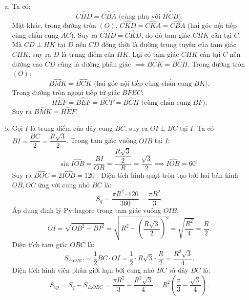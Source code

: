 \begin{bt}
{\begin{enumerate}[a)]
	Tứ giác $BFEC$ có hai đỉnh kề $F$ và $E$ cùng nhìn cạnh $BC$ dưới góc vuông, do đó tứ giác $BFEC$ nội tiếp đường tròn đường kính $BC$.
	Ta có $\widehat{ACT} = 90^\circ$ (góc nội tiếp chắn nửa đường tròn đường kính $AT$).
	Xét $\triangle ABD$ và $\triangle ATC$ có:
	\begin{itemize}
		\item $\widehat{ADB} = \widehat{ACT} = 90^\circ$;
		\item $\widehat{ABD} = \widehat{ATC}$ (hai góc nội tiếp cùng chắn cung $AC$).
	\end{itemize}
	Do đó $\triangle ABD \sim \triangle ATC$ (g-g).
	Suy ra $\dfrac{AB}{AT} = \dfrac{AD}{AC} \implies AB \cdot AC = AD \cdot AT$.
	\item Ta có:
	$$\widehat{CHD} = \widehat{CBA} \text{ (cùng phụ với } \widehat{HCB}\text{)}.$$
	Mặt khác, trong đường tròn $(O)$, $\widehat{CKD} = \widehat{CKA} = \widehat{CBA}$ (hai góc nội tiếp cùng chắn cung $AC$).
	Suy ra $\widehat{CHD} = \widehat{CKD}$, do đó tam giác $CHK$ cân tại $C$.
	Mà $CD \perp HK$ tại $D$ nên $CD$ đồng thời là đường trung tuyến của tam giác $CHK$, suy ra $D$ là trung điểm của $HK$.
	Lại có tam giác $CHK$ cân tại $C$ nên đường cao $CD$ cũng là đường phân giác $\implies \widehat{BCK} = \widehat{BCH}$.
	Trong đường tròn $(O)$:
	$$\widehat{BMK} = \widehat{BCK} \text{ (hai góc nội tiếp cùng chắn cung } BK\text{)}.$$
	Trong đường tròn ngoại tiếp tứ giác $BFEC$:
	$$\widehat{HEF} = \widehat{BEF} = \widehat{BCF} = \widehat{BCH} \text{ (cùng chắn cung } BF\text{)}.$$
	Suy ra $\widehat{BMK} = \widehat{HEF}$.
	\item Gọi $I$ là trung điểm của dây cung $BC$, suy ra $OI \perp BC$ tại $I$.
	Ta có $BI = \dfrac{BC}{2} = \dfrac{R\sqrt{3}}{2}$.
	Trong tam giác vuông $OIB$ tại $I$:
	$$\sin \widehat{IOB} = \dfrac{BI}{OB} = \dfrac{\dfrac{R\sqrt{3}}{2}}{R} = \dfrac{\sqrt{3}}{2} \implies \widehat{IOB} = 60^\circ.$$
	Suy ra $\widehat{BOC} = 2\widehat{IOB} = 120^\circ$.
	Diện tích hình quạt tròn tạo bởi hai bán kính $OB, OC$ ứng với cung nhỏ $BC$ là:
	$$S_q = \dfrac{\pi R^2 \cdot 120}{360} = \dfrac{\pi R^2}{3}.$$
	Áp dụng định lý Pythagore trong tam giác vuông $OIB$:
	$$OI = \sqrt{OB^2 - BI^2} = \sqrt{R^2 - \left(\dfrac{R\sqrt{3}}{2}\right)^2} = \sqrt{\dfrac{R^2}{4}} = \dfrac{R}{2}.$$
	Diện tích tam giác $OBC$ là:
	$$S_{\triangle OBC} = \dfrac{1}{2} BC \cdot OI = \dfrac{1}{2} \cdot R\sqrt{3} \cdot \dfrac{R}{2} = \dfrac{R^2\sqrt{3}}{4}.$$
	Diện tích hình viên phân giới hạn bởi cung nhỏ $BC$ và dây $BC$ là:
	$$S_{vp} = S_q - S_{\triangle OBC} = \dfrac{\pi R^2}{3} - \dfrac{R^2\sqrt{3}}{4} = R^2\left(\dfrac{\pi}{3} - \dfrac{\sqrt{3}}{4}\right).$$
\end{enumerate}
}
\end{bt}
